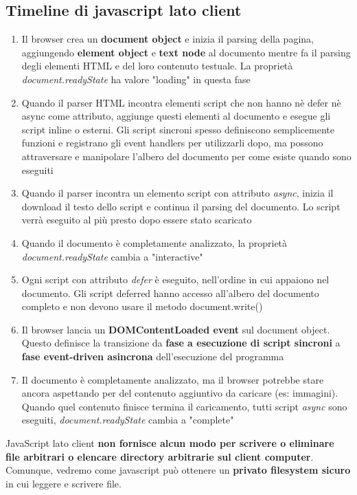 \subsection{Timeline di javascript lato client}
\begin{enumerate}
    \item Il browser crea un \textbf{document object} e inizia il parsing della pagina, aggiungendo \textbf{element object} e \textbf{text node} al documento mentre fa il parsing degli elementi HTML e del loro contenuto testuale. La proprietà \emph{document.readyState} ha valore "loading" in questa fase
    \item Quando il parser HTML incontra elementi script che non hanno nè defer nè async come attributo, aggiunge questi elementi al documento e esegue gli script inline o esterni. Gli script sincroni spesso definiscono semplicemente funzioni e registrano gli event handlers per utilizzarli dopo, ma possono attraversare e manipolare l'albero del documento per come esiste quando sono eseguiti
    \item Quando il parser incontra un elemento script con attributo \emph{async}, inizia il download il testo dello script e continua il parsing del documento. Lo script verrà eseguito al più presto dopo essere stato scaricato
    \item Quando il documento è completamente analizzato, la proprietà \emph{document.readyState} cambia a "interactive"
    \item Ogni script con attributo \emph{defer} è eseguito, nell'ordine in cui appaiono nel documento. Gli script deferred hanno accesso all'albero del documento completo e non devono usare il metodo document.write()
    \item Il browser lancia un \textbf{DOMContentLoaded event} sul document object. Questo definisce la transizione da \textbf{fase a esecuzione di script sincroni} a \textbf{fase event-driven asincrona} dell'esecuzione del programma
    \item Il documento è completamente analizzato, ma il browser potrebbe stare ancora aspettando per del contenuto aggiuntivo da caricare (es: immagini). Quando quel contenuto finisce termina il caricamento, tutti script \emph{async}  sono eseguiti, \emph{document.readyState} cambia a "complete"
\end{enumerate}

JavaScript lato client \textbf{non fornisce alcun modo per scrivere o
eliminare file arbitrari o elencare directory arbitrarie sul client
computer}. Comunque, vedremo come javascript può ottenere un \textbf{privato filesystem sicuro} in cui leggere e scrivere file.

